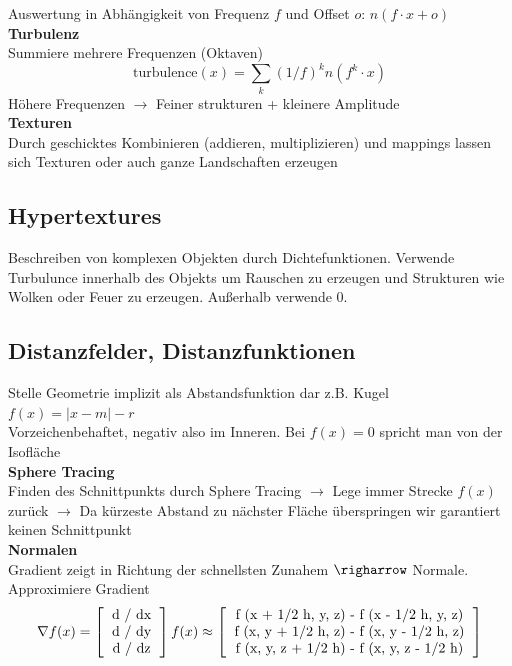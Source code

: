 \documentclass[10pt,a4paper]{article}
\begin{document}
        Auswertung in Abhängigkeit von Frequenz \(f\) und Offset \(o\): \(n(f \cdot x + o)\)\\

        \textbf{Turbulenz}\\
        Summiere mehrere Frequenzen (Oktaven)\\
        \[\text{turbulence}(x) = \sum_k (1 / f)^k n(f^k \cdot x)\]
        Höhere Frequenzen \(\rightarrow\) Feiner strukturen + kleinere Amplitude\\

        \textbf{Texturen}\\
        Durch geschicktes Kombinieren (addieren, multiplizieren) und mappings lassen sich Texturen oder auch
        ganze Landschaften erzeugen
        
        \subsection{Hypertextures}
        Beschreiben von komplexen Objekten durch Dichtefunktionen. Verwende Turbulunce innerhalb des Objekts
        um Rauschen zu erzeugen und Strukturen wie Wolken oder Feuer zu erzeugen. Außerhalb verwende 0.
        
        \subsection{Distanzfelder, Distanzfunktionen}
        Stelle Geometrie implizit als Abstandsfunktion dar z.B. Kugel \(f(x) = | x - m | - r\)\\
        Vorzeichenbehaftet, negativ also im Inneren. Bei \(f(x) = 0\) spricht man von der Isofläche\\

        \textbf{Sphere Tracing}\\
        Finden des Schnittpunkts durch Sphere Tracing \(\rightarrow\) Lege immer Strecke \(f(x)\) zurück
        \(\rightarrow\) Da kürzeste Abstand zu nächster Fläche überspringen wir garantiert keinen Schnittpunkt\\

        \textbf{Normalen}\\
        Gradient zeigt in Richtung der schnellsten Zunahem \(\righarrow\) Normale. Approximiere Gradient
        \[\nabla f(x) = \left[
            \begin{tabular}{c}
              d / dx\\
              d / dy \\
              d / dz\\
              \end{tabular}
            \right] f(x)
            \approx
            \left[
              \begin{tabular}{c}
                f (x + 1/2 h, y, z) - f (x - 1/2 h, y, z)\\
                f (x, y + 1/2 h, z) - f (x, y - 1/2 h, z)\\
                f (x, y, z + 1/2 h) - f (x, y, z - 1/2 h)\\
              \end{tabular}
            \right]
          \]
\end{document}
